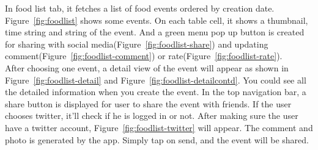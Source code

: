    In food list tab, it fetches a list of food events ordered by creation date. Figure~\ref{fig:foodlist} shows some events. On each table cell, it shows a thumbnail, time string and string of the event. And a green menu pop up button is created for sharing with social media(Figure~\ref{fig:foodlist-share}) and updating comment(Figure~\ref{fig:foodlist-comment}) or rate(Figure~\ref{fig:foodlist-rate}). \\
   
   After choosing one event, a detail view of the event will appear as shown in Figure~\ref{fig:foodlist-detail} and Figure~\ref{fig:foodlist-detailcontd}. You could see all the detailed information when you create the event. In the top navigation bar, a share button is displayed for user to share the event with friends. If the user chooses twitter, it'll check if he is logged in or not. After making sure the user have a twitter account, Figure~\ref{fig:foodlist-twitter} will appear. The comment and photo is generated by the app. Simply tap on send, and the event will be shared. \\
   

